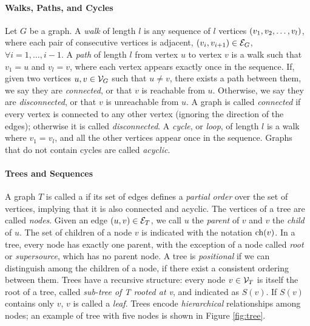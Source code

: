 \paragraph{Walks, Paths, and Cycles}
Let $G$ be a graph. A \emph{walk} of length $l$ is any sequence of $l$ vertices $\left( v_1, v_2, \ldots, v_l \right)$, where each pair of consecutive vertices is adjacent, \ie $\Seq{v_i, v_{i+1}} \in \Cal{E}_G$, $\forall i= 1, \ldots, i-1$. A \emph{path} of length $l$ from vertex $u$ to vertex $v$ is a walk such that $v_1 = u$ and $v_l = v$, where each vertex appears exactly once in the sequence. If, given two vertices $u, v \in \Cal{V}_G$ such that $u \neq v$, there exists a path between them, we say they are \emph{connected}, or that $v$ is reachable from $u$. Otherwise, we say they are \emph{disconnected}, or that $v$ is unreachable from $u$. A graph is called \emph{connected} if every vertex is connected to any other vertex (ignoring the direction of the edges); otherwise it is called \emph{disconnected}. A \emph{cycle}, or \emph{loop}, of length $l$ is a walk where $v_1 = v_l$, and all the other vertices appear once in the sequence. Graphs that do not contain cycles are called \emph{acyclic}. 

\paragraph{Trees and Sequences}
A graph $T$ is called a  if its set of edges defines a \emph{partial order} over the set of vertices, implying that it is also connected and acyclic. The vertices of a tree are called \emph{nodes}. Given an edge $(u, v) \in \Cal{E}_T$, we call $u$ the \emph{parent} of $v$ and $v$ the \emph{child} of $u$. The set of children of a node $v$ is indicated with the notation $\mathrm{ch}(v)$. In a tree, every node has exactly one parent, with the exception of a node called \emph{root} or \emph{supersource}, which has no parent node. A tree is \emph{positional} if we can distinguish among the children of a node, \ie if there exist a consistent ordering between them. Trees have a recursive structure: every node $v \in \Cal{V}_T$ is itself the root of a tree, called \emph{sub-tree of T rooted at v}, and indicated as $S(v)$. If $S(v)$ contains only $v$, $v$ is called a \emph{leaf}. Trees encode \emph{hierarchical} relationships among nodes; an example of tree with five nodes is shown in Figure \ref{fig:tree}. 

